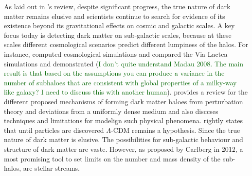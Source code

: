 \documentclass{aa}
\newcommand{\salvatore}[1]{\textcolor{darkgreen}{{#1}}}
\begin{document}
  As laid out in \citet{2021PrPNP.11903865A}'s review, despite significant progress, the true nature of dark matter remains elusive and scientists continue to search for evidence of its existence beyond its gravitational effects on cosmic and galactic scales. A key focus today is detecting dark matter on sub-galactic scales, because at these scales different cosmological scenarios predict different lumpiness of the halos. For instance, \citet{2008ApJ...679.1260M} computed cosmological simulations and compared the Via Lactea simulations \citep{2008ApJ...679.1260M} and demonstrated (\salvatore{I don't quite understand Madau 2008. The main result is that based on the assumptions you can produce a variance in the number of subhaloes that are consistent with global properties of a milky-way like galaxy? I need to discuss this with another human}). \citet{2019Galax...7...81Z} provides a review for the different proposed mechanisms of forming dark matter haloes from perturbation theory and deviations from a uniformly dense medium and also disccses techniques and limitations for modelign such physical phenomena. \citet{2019Galax...7...81Z} rightly states that until particles are discovered $\Lambda$-CDM remains a hypothesis. Since the true nature of dark matter is elusive. The possibilities for sub-galactic behaviour and structure of dark matter are vaste. However, as proposed by Carlberg in 2012, a most promising tool to set limits on the number and mass density of the sub-halos, are stellar streams.
  
\end{document}
